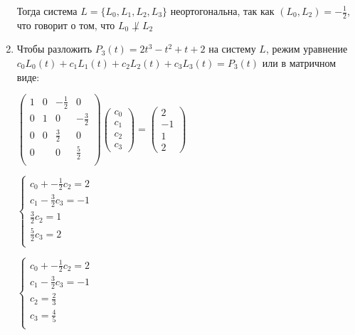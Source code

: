 \begin{enumerate}
    Тогда система $L = \{L_0, L_1, L_2, L_3\}$ неортогональна, так как $(L_0, L_2) = -\frac{1}{2}$, что говорит о том, что $L_0 \not\perp L_2$


    \item Чтобы разложить $P_3(t)=2t^3-t^2+t+2$ на систему $L$, режим уравнение $c_0 L_0(t) + c_1 L_1(t) + c_2 L_2(t) + c_3 L_3(t) = P_3(t)$ или в матричном виде:

    \vspace{5mm}


    $\displaystyle \begin{pmatrix}
         1 & 0 & -\frac{1}{2} & 0 \\
         0 & 1 & 0 & -\frac{3}{2} \\
         0 & 0 & \frac{3}{2} & 0 \\
         0 &  & 0 & \frac{5}{2} \\
    \end{pmatrix}
    \begin{pmatrix}
         c_0 \\ c_1 \\ c_2 \\ c_3
    \end{pmatrix} =
    \begin{pmatrix}
         2 \\ -1 \\ 1 \\ 2
    \end{pmatrix}$

    \vspace{5mm}

    \begin{multicols}{3}
    $\displaystyle \begin{cases}
         c_0 + -\frac{1}{2}c_2 = 2 \\
         c_1 - \frac{3}{2}c_3 = -1 \\
         \frac{3}{2}c_2 = 1 \\
         \frac{5}{2}c_3 = 2 \\
    \end{cases}$

    $\displaystyle \begin{cases}
         c_0 + -\frac{1}{2}c_2 = 2 \\
         c_1 - \frac{3}{2}c_3 = -1 \\
         c_2 = \frac{2}{3} \\
         c_3 = \frac{4}{5} \\
    \end{cases}$


\end{multicols}
\end{enumerate}
